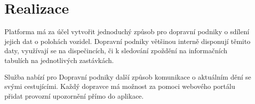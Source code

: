 \setlength{\headheight}{15.04742pt}
\chapter{Realizace}
Platforma má za účel vytvořit jednoduchý způsob pro dopravní podniky o sdílení jejich dat o polohách vozidel.
Dopravní podniky většinou interně disponují těmito daty, využívají se na dispečincích, či k sledování zpoždění na informačních tabulích na jednotlivých zastávkách.\par
Služba nabízí pro Dopravní podniky další způsob komunikace o aktuálním dění se svými cestujícími. Každý dopravce má možnost za pomoci webového portálu přidat provozní upozornění přímo do aplikace.




